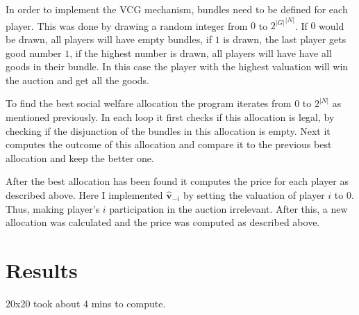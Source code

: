 \documentclass[12pt]{article}
\begin{document}
In order to implement the VCG mechanism, bundles need to be defined for each player. This was done by drawing a random integer from $0$ to ${2^{|G|}}^{|N|}$. If $0$ would be drawn, all players will have empty bundles, if $1$ is drawn, the last player gets good number $1$, if the highest number is drawn, all players will have have all goods in their bundle. In this case the player with the highest valuation will win the auction and get all the goods.

To find the best social welfare allocation the program iterates from $0$ to $2^|N|$ as mentioned previously. In each loop it first checks if this allocation is legal, by checking if the disjunction of the bundles in this allocation is empty. Next it computes the outcome of this allocation and compare it to the previous best allocation and keep the better one.

After the best allocation has been found it computes the price for each player as described above. Here I implemented $\boldsymbol{\hat{v}}_{-i}$ by setting the valuation of player $i$ to 0. Thus, making player's $i$ participation in the auction irrelevant. After this, a new allocation was calculated and the price was computed as described above.

\section{Results}
20x20 took about 4 mins to compute.
\end{document}
